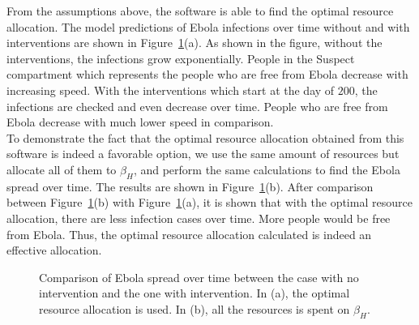 \documentclass[11pt,letter]{article}
\begin{document}
From the assumptions above, the software is able to find the optimal resource allocation. The model predictions of Ebola infections over time without and with interventions are shown in Figure~\ref{allocation}(a). As shown in the figure, without the interventions, the infections grow exponentially. People in the Suspect compartment which represents the people who are free from Ebola decrease with increasing speed. With the interventions which start at the day of $200$, the infections are checked and even decrease over time. People who are free from Ebola decrease with much lower speed in comparison. \\

To demonstrate the fact that the optimal resource allocation obtained from this software is indeed a favorable option, we use the same amount of resources but allocate all of them to $\beta_H$, and perform the same calculations to find the Ebola spread over time. The results are shown in Figure~\ref{allocation}(b). After comparison between Figure~\ref{allocation}(b) with Figure~\ref{allocation}(a), it is shown that with the optimal resource allocation, there are less infection cases over time. More people would be free from Ebola. Thus, the optimal resource allocation calculated is indeed an effective allocation. \\
\begin{figure}
	\centering

\caption{
Comparison of Ebola spread over time between the case with no intervention and the one with intervention. In (a), the optimal resource allocation is used. In (b), all the resources is spent on $\beta_H$. 
	\label{allocation}}
\end{figure}
\end{document}
